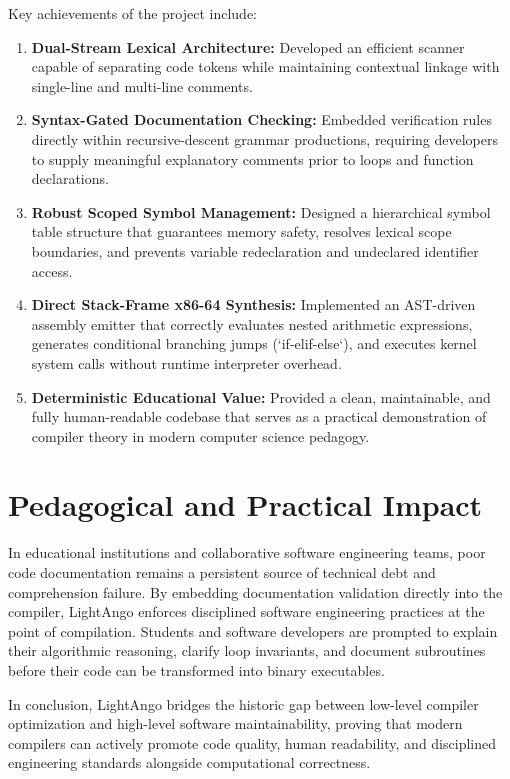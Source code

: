 Key achievements of the project include:
\begin{enumerate}
    \item \textbf{Dual-Stream Lexical Architecture:} Developed an efficient scanner capable of separating code tokens while maintaining contextual linkage with single-line and multi-line comments.
    \item \textbf{Syntax-Gated Documentation Checking:} Embedded verification rules directly within recursive-descent grammar productions, requiring developers to supply meaningful explanatory comments prior to loops and function declarations.
    \item \textbf{Robust Scoped Symbol Management:} Designed a hierarchical symbol table structure that guarantees memory safety, resolves lexical scope boundaries, and prevents variable redeclaration and undeclared identifier access.
    \item \textbf{Direct Stack-Frame x86-64 Synthesis:} Implemented an AST-driven assembly emitter that correctly evaluates nested arithmetic expressions, generates conditional branching jumps (`if-elif-else`), and executes kernel system calls without runtime interpreter overhead.
    \item \textbf{Deterministic Educational Value:} Provided a clean, maintainable, and fully human-readable codebase that serves as a practical demonstration of compiler theory in modern computer science pedagogy.
\end{enumerate}

\section{Pedagogical and Practical Impact}
In educational institutions and collaborative software engineering teams, poor code documentation remains a persistent source of technical debt and comprehension failure. By embedding documentation validation directly into the compiler, LightAngo enforces disciplined software engineering practices at the point of compilation. Students and software developers are prompted to explain their algorithmic reasoning, clarify loop invariants, and document subroutines before their code can be transformed into binary executables.

In conclusion, LightAngo bridges the historic gap between low-level compiler optimization and high-level software maintainability, proving that modern compilers can actively promote code quality, human readability, and disciplined engineering standards alongside computational correctness.
\newpage
